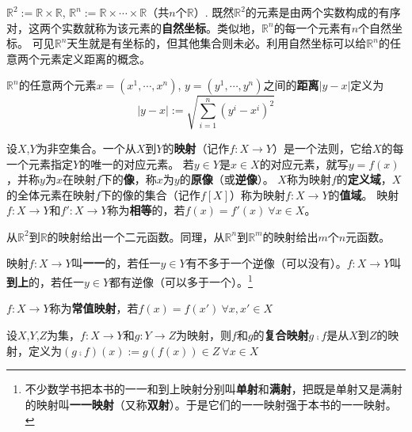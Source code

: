 \begin{example}
$\mathbb{R}^2 := \mathbb{R} \times \mathbb{R}$, $\mathbb{R}^n := \mathbb{R} \times \cdots \times \mathbb{R}$（共$n$个$\mathbb{R}$）.
既然$\mathbb{R}^2$的元素是由两个实数构成的有序对，这两个实数就称为该元素的\textbf{自然坐标}。类似地，$\mathbb{R}^n$的每一个元素有$n$个自然坐标。
可见$\mathbb{R}^n$天生就是有坐标的，但其他集合则未必。利用自然坐标可以给$\mathbb{R}^n$的任意两个元素定义距离的概念。
\end{example}

\begin{definition}
$\mathbb{R}^n$的任意两个元素$x = (x^1, \cdots, x^n)$, $y = (y^1, \cdots, y^n)$之间的\textbf{距离}$|y - x|$定义为
$$|y - x| := \sqrt{\sum^n_{i = 1}(y^i - x^i)^2}$$
\end{definition}

\begin{definition}
设$X$,$Y$为非空集合。一个从$X$到$Y$的\textbf{映射}（记作$f \colon X \to Y$）是一个法则，它给$X$的每一个元素指定$Y$的唯一的对应元素。
若$y \in Y$是$x \in X$的对应元素，就写$y = f(x)$，并称$y$为$x$在映射$f$下的\textbf{像}，称$x$为$y$的\textbf{原像}（或\textbf{逆像}）。
$X$称为映射$f$的\textbf{定义域}，$X$的全体元素在映射$f$下的像的集合（记作$f[X]$）称为映射$f \colon X \to Y$的\textbf{值域}。
映射$f \colon X \to Y$和$f' \colon X \to Y$称为\textbf{相等}的，若$f(x) = f'(x) ~ \forall x \in X$。
\end{definition}

\begin{note}
从$\mathbb{R}^2$到$\mathbb{R}$的映射给出一个二元函数。同理，从$\mathbb{R}^n$到$\mathbb{R}^m$的映射给出$m$个$n$元函数。
\end{note}

\begin{definition}
映射$f \colon X \to Y$叫\textbf{一一}的，若任一$y \in Y$有不多于一个逆像（可以没有）。$f \colon X \to Y$叫\textbf{到上}的，若任一$y \in Y$都有逆像（可以多于一个）。\footnote{
不少数学书把本书的一一和到上映射分别叫\textbf{单射}和\textbf{满射}，把既是单射又是满射的映射叫\textbf{一一映射}（又称\textbf{双射}）。于是它们的一一映射强于本书的一一映射。
}
\end{definition}

\begin{definition}
$f \colon X \to Y$称为\textbf{常值映射}，若$f(x) = f(x') ~ \forall x, x' \in X$
\end{definition}

\begin{definition}
设$X$,$Y$,$Z$为集，$f \colon X \to Y$和$g \colon Y \to Z$为映射，则$f$和$g$的\textbf{复合映射}$g \comp f$是从$X$到$Z$的映射，定义为$(g \comp f)(x) := g(f(x)) \in Z ~ \forall x \in X$
\end{definition}

